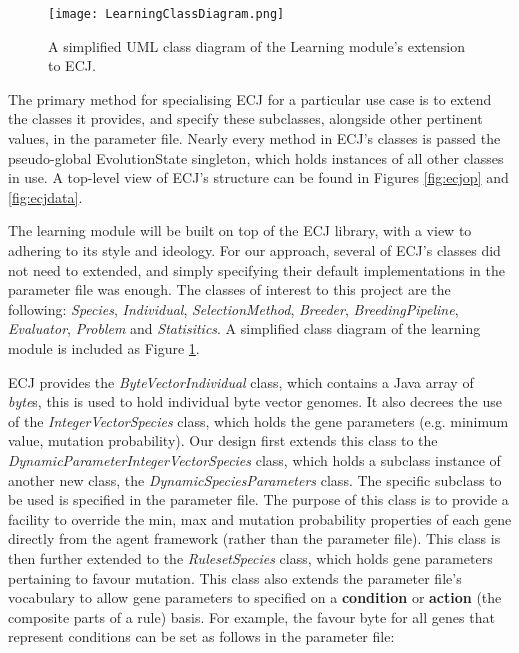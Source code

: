 \begin{figure}[t]
	\centering
	\texttt{[image: LearningClassDiagram.png]}
	\caption{A simplified UML class diagram of the Learning module's extension to ECJ.}
	\label{fig:lucl}
\end{figure}


The primary method for specialising ECJ for a particular use case is to extend the classes it provides, and specify these subclasses, alongside other pertinent values, in the parameter file. Nearly every method in ECJ's classes is passed the pseudo-global EvolutionState singleton, which holds instances of all other classes in use. A top-level view of ECJ's structure can be found in Figures \ref{fig:ecjop} and \ref{fig:ecjdata}.

The learning module will be built on top of the ECJ library, with a view to adhering to its style and ideology. For our approach, several of ECJ's classes did not need to extended, and simply specifying their default implementations in the parameter file was enough. The classes of interest to this project are the following: \emph{Species}, \emph{Individual}, \emph{SelectionMethod}, \emph{Breeder}, \emph{BreedingPipeline}, \emph{Evaluator}, \emph{Problem} and \emph{Statisitics}. A simplified class diagram of the learning module is included as Figure \ref{fig:lucl}.

ECJ provides the \emph{ByteVectorIndividual} class, which contains a Java array of \emph{byte}s, this is used to hold individual byte vector genomes. It also decrees the use of the \emph{IntegerVectorSpecies} class, which holds the gene parameters (e.g. minimum value, mutation probability). Our design first extends this class to the \emph{DynamicParameterIntegerVectorSpecies} class, which holds a subclass instance of another new class, the \emph{DynamicSpeciesParameters} class. The specific subclass to be used is specified in the parameter file. The purpose of this class is to provide a facility to override the min, max and mutation probability properties of each gene directly from the agent framework (rather than the parameter file). This class is then further extended to the \emph{RulesetSpecies} class, which holds gene parameters pertaining to favour mutation. This class also extends the parameter file's vocabulary to allow gene parameters to specified on a \textbf{condition} or \textbf{action} (the composite parts of a rule) basis. For example, the favour byte for all genes that represent conditions can be set as follows in the parameter file:

